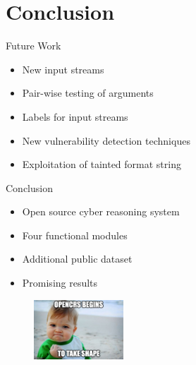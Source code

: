 \section{Conclusion}

\begin{frame}{Future Work}
    \begin{itemize}
        \item New input streams \pause
        \item Pair-wise testing of arguments\pause
        \item Labels for input streams \pause
        \item New vulnerability detection techniques \pause
        \item Exploitation of tainted format string
    \end{itemize}
\end{frame}

\begin{frame}{Conclusion}
    \begin{itemize}
        \item Open source cyber reasoning system \pause
        \item Four functional modules \pause
        \item Additional public dataset \pause
        \item Promising results
    \end{itemize}

    \vfill \pause
    \begin{figure}
        \centering
        \includegraphics[width=0.3\textwidth]{images/success_kid.jpg}
    \end{figure}
\end{frame}

